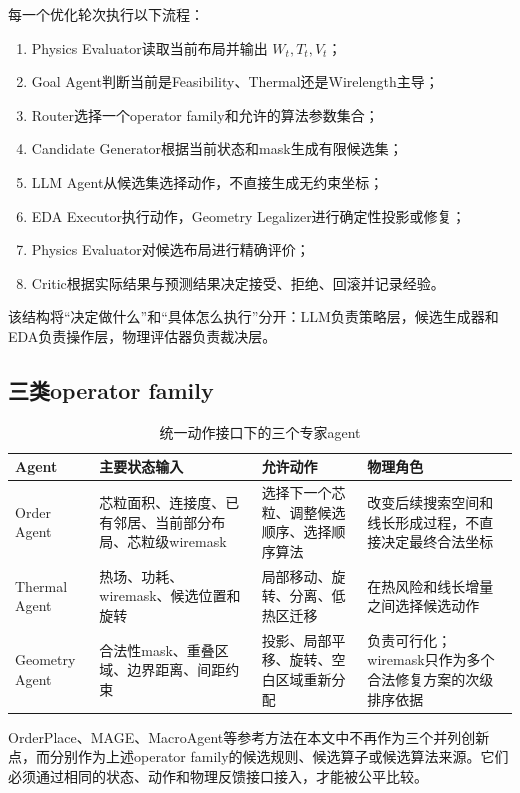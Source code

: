 \documentclass[UTF8,a4paper,12pt]{ctexart}
\begin{document}
每一个优化轮次执行以下流程：

\begin{enumerate}[leftmargin=2.5em]
  \item Physics Evaluator读取当前布局并输出 $W_t,T_t,V_t$；
  \item Goal Agent判断当前是Feasibility、Thermal还是Wirelength主导；
  \item Router选择一个operator family和允许的算法参数集合；
  \item Candidate Generator根据当前状态和mask生成有限候选集；
  \item LLM Agent从候选集选择动作，不直接生成无约束坐标；
  \item EDA Executor执行动作，Geometry Legalizer进行确定性投影或修复；
  \item Physics Evaluator对候选布局进行精确评价；
  \item Critic根据实际结果与预测结果决定接受、拒绝、回滚并记录经验。
\end{enumerate}

该结构将“决定做什么”和“具体怎么执行”分开：LLM负责策略层，候选生成器和EDA负责操作层，物理评估器负责裁决层。

\subsection{三类operator family}

\begin{table}[htbp]
\centering
\caption{统一动作接口下的三个专家agent}
\begin{tabularx}{\textwidth}{>{\raggedright\arraybackslash}p{2.2cm}X X X}
\toprule
Agent & 主要状态输入 & 允许动作 & 物理角色 \\
\midrule
Order Agent & 芯粒面积、连接度、已有邻居、当前部分布局、芯粒级wiremask & 选择下一个芯粒、调整候选顺序、选择顺序算法 & 改变后续搜索空间和线长形成过程，不直接决定最终合法坐标 \\
Thermal Agent & 热场、功耗、wiremask、候选位置和旋转 & 局部移动、旋转、分离、低热区迁移 & 在热风险和线长增量之间选择候选动作 \\
Geometry Agent & 合法性mask、重叠区域、边界距离、间距约束 & 投影、局部平移、旋转、空白区域重新分配 & 负责可行化；wiremask只作为多个合法修复方案的次级排序依据 \\
\bottomrule
\end{tabularx}
\end{table}

OrderPlace、MAGE、MacroAgent等参考方法在本文中不再作为三个并列创新点，而分别作为上述operator family的候选规则、候选算子或候选算法来源。它们必须通过相同的状态、动作和物理反馈接口接入，才能被公平比较。
\end{document}
